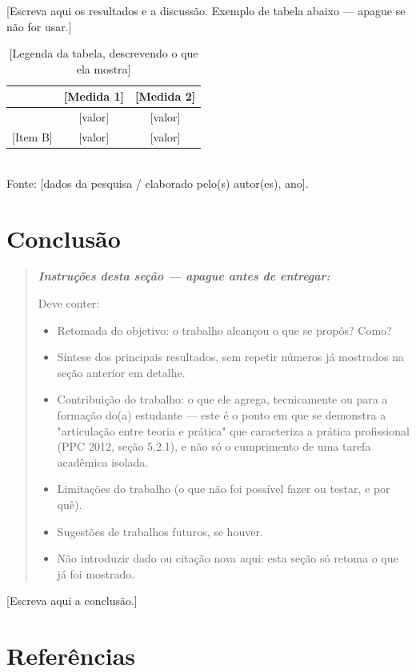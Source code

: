 \documentclass[article,12pt,a4paper]{abntex2}
\newenvironment{instrucoes}{%
  \begin{quotation}\footnotesize\itshape
  \noindent\textbf{\upshape Instruções desta seção — apague antes de entregar:}\par\smallskip
}{%
  \end{quotation}
}
\begin{document}
[Escreva aqui os resultados e a discussão. Exemplo de tabela abaixo — apague se não for usar.]

\begin{table}[!ht]
  \centering
  \caption{[Legenda da tabela, descrevendo o que ela mostra]}
  \begin{tabular}{lcc}
    \hline
    [Categoria] & [Medida 1] & [Medida 2] \\
    \hline
    [Item A] & [valor] & [valor] \\{}
    [Item B] & [valor] & [valor] \\
    \hline
  \end{tabular}
  \\[0.3em]
  {\footnotesize Fonte: [dados da pesquisa / elaborado pelo(s) autor(es), ano].}
\end{table}

\section{Conclusão}

\begin{instrucoes}
Deve conter:
\begin{itemize}
  \item Retomada do objetivo: o trabalho alcançou o que se propôs? Como?
  \item Síntese dos principais resultados, sem repetir números já mostrados na seção anterior em detalhe.
  \item Contribuição do trabalho: o que ele agrega, tecnicamente ou para a formação do(a) estudante — este é o ponto em que se demonstra a "articulação entre teoria e prática" que caracteriza a prática profissional (PPC 2012, seção 5.2.1), e não só o cumprimento de uma tarefa acadêmica isolada.
  \item Limitações do trabalho (o que não foi possível fazer ou testar, e por quê).
  \item Sugestões de trabalhos futuros, se houver.
  \item Não introduzir dado ou citação nova aqui: esta seção só retoma o que já foi mostrado.
\end{itemize}
\end{instrucoes}

[Escreva aqui a conclusão.]

\postextual

\section*{Referências}
\end{document}
